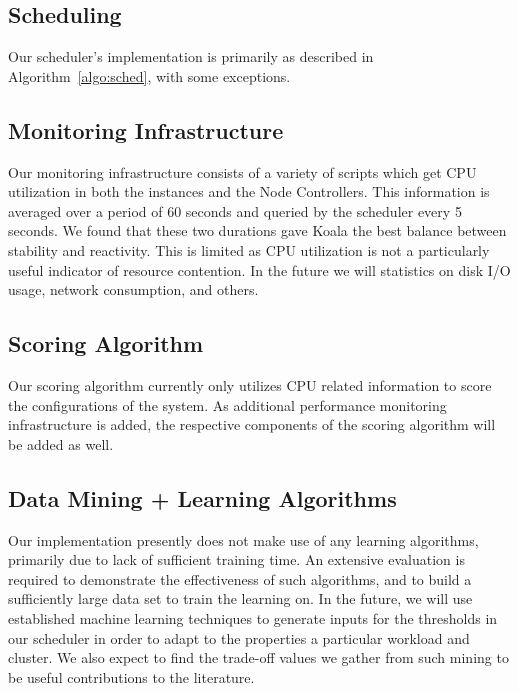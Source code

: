 \subsection{Scheduling}


Our scheduler's implementation is primarily as described in
Algorithm~\ref{algo:sched}, with some exceptions.

\subsection{Monitoring Infrastructure}

Our monitoring infrastructure consists of a variety of scripts which get CPU utilization in both the instances and the Node Controllers.   This information is averaged over a period of 60 seconds and queried by the scheduler every 5 seconds.  We found that these two durations gave Koala the best balance between stability and reactivity.  This is limited as CPU utilization is not a particularly useful indicator of resource contention.  In the future we will statistics on disk I/O usage, network consumption, and others.

\subsection{Scoring Algorithm}

Our scoring algorithm currently only utilizes CPU related information to score the configurations of the system.  As additional performance monitoring infrastructure is added, the respective components of the scoring algorithm will be added as well.

\subsection{Data Mining + Learning Algorithms}

Our implementation presently does not make use of any learning algorithms,
primarily due to lack of sufficient training time.  An extensive evaluation is required
to demonstrate the effectiveness of such algorithms, and to build a sufficiently
large data set to train the learning on.  In the future, we will use established
machine learning techniques to generate inputs for the thresholds in our
scheduler in order to adapt to the properties a particular workload and cluster.
We also expect to find the trade-off values we gather from such mining to be
useful contributions to the literature.

